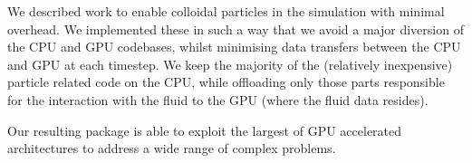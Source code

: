 We described work to enable colloidal particles in the simulation with
minimal overhead. We implemented these in such a way that we avoid a
major diversion of the CPU and GPU codebases, whilst minimising data
transfers between the CPU and GPU at each timestep. We keep the
majority of the (relatively inexpensive) particle related code on the
CPU, while offloading only those parts responsible for the interaction
with the fluid to the GPU (where the fluid data resides).

Our resulting package is able to exploit the largest of GPU
accelerated architectures to address a wide range of complex problems.




 





%
%

